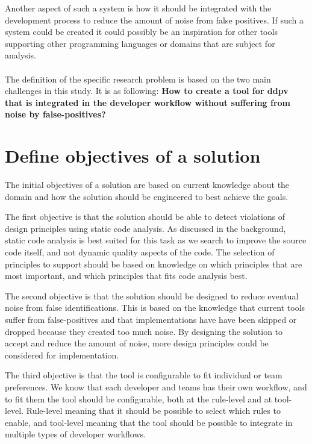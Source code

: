 \documentclass{report}
\begin{document}
Another aspect of such a system is how it should be integrated with the development process to reduce the amount of noise from false positives. If such a system could be created it could possibly be an inspiration for other tools supporting other programming languages or domains that are subject for analysis. \\

\\ The definition of the specific research problem is based on the two main challenges in this study. It is as following: \textbf{How to create a tool for \gls{ddpv} that is integrated in the developer workflow without suffering from noise by false-positives?}


\section{Define objectives of a solution}
\label{objectives-of-solution}

The initial objectives of a solution are based on current knowledge about the domain and how the solution should be engineered to best achieve the goals. 

The first objective is that the solution should be able to detect violations of design principles using static code analysis. As discussed in the background, static code analysis is best suited for this task as we search to improve the source code itself, and not dynamic quality aspects of the code. The selection of principles to support should be based on knowledge on which principles that are most important, and which principles that fits code analysis best. 

The second objective is that the solution should be designed to reduce eventual noise from false identifications. This is based on the knowledge that current tools suffer from false-positives and that implementations have have been skipped or dropped because they created too much noise. By designing the solution to accept and reduce the amount of noise, more design principles could be considered for implementation.

The third objective is that the tool is configurable to fit individual or team preferences. We know that each developer and teams has their own workflow, and to fit them the tool should be configurable, both at the rule-level and at tool-level. Rule-level meaning that it should be possible to select which rules to enable, and tool-level meaning that the tool should be possible to integrate in multiple types of developer workflows.
\end{document}
